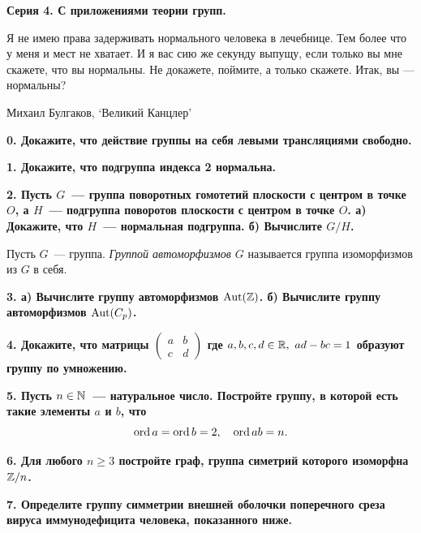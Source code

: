 \documentclass[10pt]{article}
\begin{document}
	\begin{landscape}

	\pagestyle{empty}
	\begin{multicols}{2}

	\centerline{\bf{Серия 4. С приложениями теории групп.}}

	\epigraph{Я не имею права задерживать нормального человека в лечебнице. Тем более что у меня и мест не хватает. И я вас сию же секунду выпущу, если только вы мне скажете, что вы нормальны. Не докажете, поймите, а только скажете. Итак, вы — нормальны?}{Михаил Булгаков, ‘Великий Канцлер’}

	\bf{0.} Докажите, что действие группы на себя левыми трансляциями свободно.  

	\bf{1.} Докажите, что подгруппа индекса 2 нормальна. 

	\bf{2.} Пусть $G$~--- группа поворотных гомотетий плоскости с центром в точке $O$, а $H$~--- подгруппа поворотов плоскости с центром в точке $O$. а) Докажите, что $H$~--- нормальная подгруппа. б) Вычислите $G/H$.

	\begin{definition} 
		Пусть $G$~--- группа. \emph{Группой автоморфизмов $G$} называется группа изоморфизмов из $G$ в себя. 
	\end{definition}

	\bf{3.} а) Вычислите группу автоморфизмов $\mathrm{\operatorname{Aut}}(\mathbb{Z})$. б) Вычислите группу автоморфизмов $\mathrm{\operatorname{Aut}}(C_{p})$. 

	\bf{4.} Докажите, что матрицы  $\begin{pmatrix} a & b \\ c & d \end{pmatrix}$ где $a, b, c, d \in \mathbb{R}, \ ad - bc = 1$ образуют группу по умножению. 

	\bf{5.} Пусть $n \in \mathbb{N}$~--- натуральное число. Постройте группу, в которой есть такие элементы $a$ и $b$, что 
	\[
		\operatorname{ord}{a} = \operatorname{ord}{b} =  2, \quad \operatorname{ord}{ab} = n.
	\]
	
	\bf{6.} Для любого $n \ge 3$ постройте граф, группа симетрий которого изоморфна $\mathbb{Z}/n$.

	\bf{7.} Определите группу симметрии внешней оболочки поперечного среза вируса иммунодефицита человека, показанного ниже.


\end{multicols}
\end{landscape}
\end{document}
